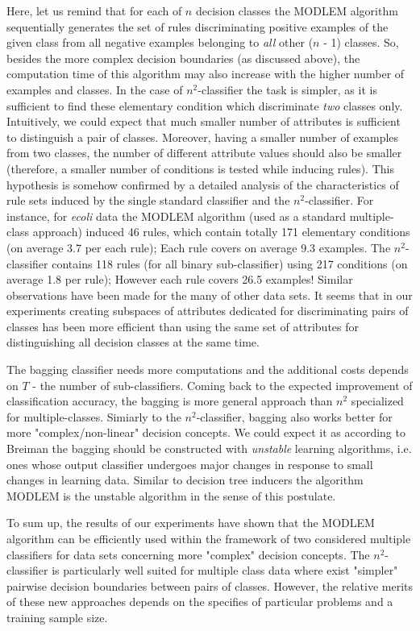 \documentclass{llncs}
\begin{document}
Here, let us remind that for each of $n$ decision classes the MODLEM
algorithm sequentially generates the set of rules discriminating positive
examples of the given class from all negative examples belonging to {\em
all} other ($n$ - 1) classes. So, besides the more complex decision
boundaries (as discussed above), the computation time of this algorithm may
also increase with the higher number of examples and classes. In the case of
$n^2$-classifier the task is simpler, as it is sufficient to find these
elementary condition which discriminate \emph{two} classes only.
Intuitively, we could expect that much smaller number of attributes is
sufficient to distinguish a pair of classes. Moreover, having a smaller
number of examples from two classes, the number of different attribute
values should also be smaller (therefore, a smaller number of conditions is
tested while inducing rules). This hypothesis is somehow confirmed by a
detailed analysis of the characteristics of rule sets induced by the single
standard classifier and the $n^2$-classifier. For instance, for {\em ecoli}
data the MODLEM algorithm (used as a standard multiple-class approach)
induced 46 rules, which contain totally 171 elementary conditions (on
average 3.7 per each rule); Each rule covers on average 9.3 examples. The
$n^2$-classifier contains 118 rules (for all binary sub-classifier) using
217 conditions (on average 1.8 per rule); However each rule covers 26.5
examples! Similar observations have been made for the many of other data
sets. It seems that in our experiments creating subspaces of attributes
dedicated for discriminating pairs of classes has been more efficient than
using the same set of attributes for distinguishing all decision classes at
the same time.

The bagging classifier needs more computations and the additional
costs depends on $T$ - the number of sub-classifiers. Coming back
to the expected improvement of classification accuracy, the
bagging is more general approach than $n^2$ specialized for
multiple-classes. Simiarly to the $n^2$-classifier, bagging also
works better for more "complex/non-linear" decision concepts. We
could expect it as  according to Breiman the bagging should be
constructed with \emph{unstable} learning algorithms, i.e. ones
whose output classifier undergoes major changes in response to
small changes in learning data. Similar to decision tree inducers
the algorithm MODLEM is the unstable algorithm in the sense of
this postulate.

To sum up, the results of our experiments have shown that the
MODLEM algorithm can be efficiently used within the framework of
two considered multiple classifiers for data sets concerning more
"complex" decision concepts. The $n^2$-classifier is particularly
well suited for multiple class data where exist "simpler" pairwise
decision boundaries between pairs of classes. However, the
relative merits of these new approaches depends on the specifies
of particular problems and a training sample size.
\end{document}
